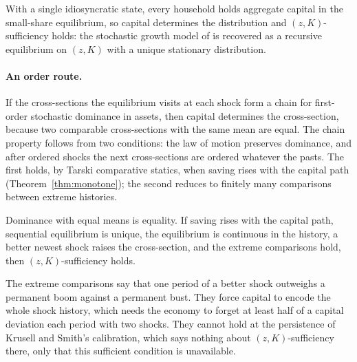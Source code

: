 \begin{theorem}\label{thm:repagent}
With a single idiosyncratic state, every household holds aggregate capital in the small-share
equilibrium, so capital determines the distribution and $(z,K)$-sufficiency holds: the stochastic
growth model of \citet{brockmirman1972} is recovered as a recursive equilibrium on $(z,K)$ with a
unique stationary distribution.
\end{theorem}

\paragraph{An order route.} If the cross-sections the equilibrium visits at each shock form a chain
for first-order stochastic dominance in assets, then capital determines the cross-section, because
two comparable cross-sections with the same mean are equal. The chain property follows from two
conditions: the law of motion preserves dominance, and after ordered shocks the next cross-sections
are ordered whatever the pasts. The first holds, by Tarski comparative statics, when saving rises
with the capital path (Theorem~\ref{thm:monotone}); the second reduces to finitely many comparisons
between extreme histories.

\begin{theorem}\label{thm:order}
Dominance with equal means is equality. If saving rises with the capital path, sequential
equilibrium is unique, the equilibrium is continuous in the history, a better newest shock raises
the cross-section, and the extreme comparisons hold, then $(z,K)$-sufficiency holds.
\end{theorem}

\noindent
The extreme comparisons say that one period of a better shock outweighs a permanent boom against a
permanent bust. They force capital to encode the whole shock history, which needs the economy to
forget at least half of a capital deviation each period with two shocks. They cannot hold at the
persistence of Krusell and Smith's calibration, which says nothing about $(z,K)$-sufficiency there,
only that this sufficient condition is unavailable.

